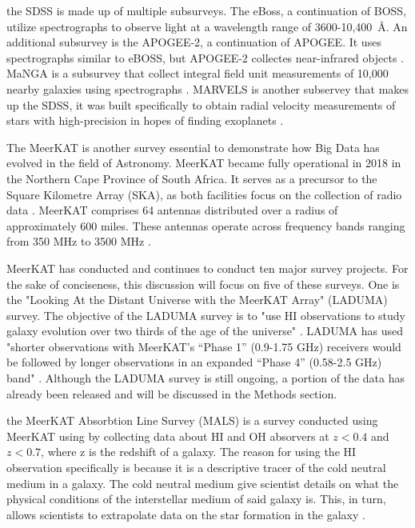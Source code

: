 \documentclass[preprint,linenumbers, longauthor]{aastex631}
\begin{document}
the SDSS is made up of multiple subsurveys. The eBoss, a continuation of BOSS, utilize spectrographs to observe light at a wavelength range of 3600-10,400~\AA \cite{dawsonSDSSIVEXTENDEDBARYON2016}.
An additional subsurvey is the APOGEE-2, a continuation of APOGEE. It uses spectrographs similar to eBOSS, but APOGEE-2 collectes near-infrared objects \cite{majewskiApachePointObservatory2017}. 
MaNGA is a subsurvey that collect integral field unit measurements of 10,000 nearby galaxies using spectrographs \cite{bundyOVERVIEWSDSSIVMaNGA2014}.
MARVELS is another subservey that makes up the SDSS, it was built specifically to obtain radial velocity measurements of stars with high-precision in hopes of finding exoplanets \cite{bundyOVERVIEWSDSSIVMaNGA2014a}.


The MeerKAT is another survey essential to demonstrate how Big Data has evolved in the field of Astronomy.
MeerKAT became fully operational in 2018 in the Northern Cape Province of South Africa. It serves as a precursor to the Square Kilometre Array (SKA), as both facilities focus on the collection of radio data \cite{jonasMeerKATRadioTelescope2018}.
MeerKAT comprises 64 antennas distributed over a radius of approximately 600 miles. These antennas operate across frequency bands ranging from 350 MHz to 3500 MHz \cite{goedhartMeerKATSpecifications2025}.

MeerKAT has conducted and continues to conduct ten major survey projects. For the sake of conciseness, this discussion will focus on five of these surveys.
One is the "Looking At the Distant Universe with the MeerKAT Array" (LADUMA) survey.
The objective of the LADUMA survey is to "use HI observations to study galaxy evolution over two thirds of the age of the universe" \cite{blythLADUMALookingDistant2018}. 
LADUMA has used "shorter observations with MeerKAT's “Phase 1” (0.9-1.75 GHz) receivers
would be followed by longer observations in an expanded “Phase 4” (0.58-2.5 GHz) band" \cite{blythLADUMALookingDistant2018}.
Although the LADUMA survey is still ongoing, a portion of the data has already been released and will be discussed in the Methods section.

the MeerKAT Absorbtion Line Survey (MALS) is a survey conducted using MeerKAT using by collecting data about HI and OH absorvers at $z < 0.4$ and $z < 0.7$, where z is the redshift of a galaxy. 
The reason for using the HI observation specifically is because it is a descriptive tracer of the cold neutral medium in a galaxy. 
The cold neutral medium give scientist details on what the physical conditions of the interstellar medium of said galaxy is. This, in turn, allows scientists to extrapolate data on the star formation in the galaxy \cite{guptaBlindOHAbsorption2021}.
\end{document}
